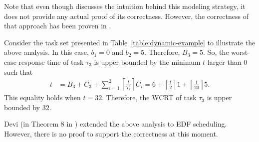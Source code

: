 Note that even though \cite{Liu:2000:RS:518501} discusses the intuition behind this modeling strategy, it does not provide any actual proof of its correctness. 
However, the correctness of that approach has been proven in \cite{ChenHuangNelissen,ChenECRTS2016-suspension}. 

\begin{example}
\label{ex:suspension-blocking}    
Consider the task set presented in Table~\ref{table:dynamic-example} to illustrate the above analysis. In this case, $b_1 = 0$ and $b_2 = 5$. Therefore, $B_3 = 5$. So, the worst-case response time of task $\tau_3$ is upper bounded by the minimum $t$ larger than $0$ such that 
\begin{align*}
t & = B_3+C_3+\sum_{i=1}^2 \left\lceil \frac{t}{T_i} \right\rceil C_i = 6+\left\lceil \frac{t}{2} \right\rceil 1 +\left\lceil \frac{t}{20} \right\rceil 5.
\end{align*} 
This equality holds when $t=32$. Therefore, the WCRT of task $\tau_{3}$ is upper bounded by $32$.
\hfill\myendproof  
\end{example}



Devi (in Theorem 8 in \cite[Section 4.5]{DBLP:conf/ecrts/Devi03}) extended the above analysis to
EDF scheduling. However, there is no proof to support the correctness at this moment.


\label{sec:model-interfering-unified}

